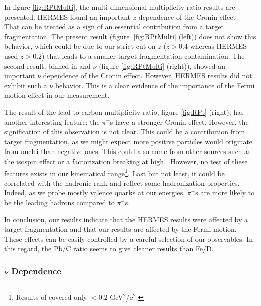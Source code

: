 In figure \ref{fig:RPtMulti}, the multi-dimensional multiplicity ratio results are presented. HERMES found an important $z$ dependence of the Cronin effect \cite{Airapetian:2007vu,Airapetian:2011jp}. That can be treated as a sign of an essential contribution from a target fragmentation. The present result 
(figure~\ref{fig:RPtMulti} (left)) does not show this behavior, which could be due to our strict cut on $z$ ($z>0.4$ whereas HERMES used $z>0.2$) that leads to a smaller target fragmentation contamination. The second result, binned in \pt and $\nu$ (figure \ref{fig:RPtMulti} (right)), showed an important 
$\nu$ dependence of the Cronin effect. However, HERMES results did not exhibit such a $\nu$ behavior. This is a clear evidence of the importance of 
the Fermi motion effect in our measurement.

The result of the lead to carbon multiplicity ratio, figure \ref{fig:RPt} 
(right), has another interesting feature: the $\pi^+$s have a stronger Cronin 
effect. However, the signification of this observation is not clear. This could be 
a contribution from target fragmentation, as we might expect more positive 
particles would originate from nuclei than negative ones. This could also come from other sources such as the isospin effect or a factorization breaking at high 
\ptp. However, no test of these features exists in our kinematical range\footnote{Results of \cite{Asaturyan:2011mq} covered only \pt$<0.2$ GeV$^2$/c$^2$.}. Last but not least, it could be correlated with the hadronic rank and reflect some hadronization properties. Indeed, as we probe mostly valence quarks at our energies, $\pi^+$s are more likely to be the leading hadrons compared to $\pi^-$s.

In conclusion, our results indicate that the HERMES results were affected by a target fragmentation and that our results are affected by the Fermi motion. These effects can be easily controlled by a careful selection of our observables. In this regard, the Pb/C ratio seems to give cleaner results than Fe/D.

\subsubsection{$\nu$ Dependence}

